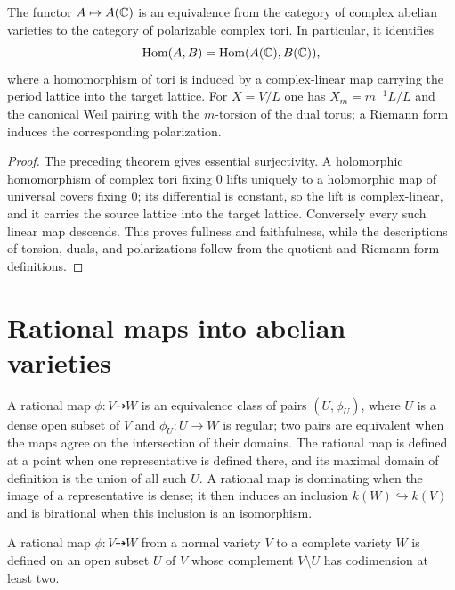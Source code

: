 \begin{theorem}
\label{thm:milne-complex-category-equivalence}

The functor $A\mapsto A(\mathbb{C})$ is an equivalence from the category of complex
abelian varieties to the category of polarizable complex tori.  In particular,
it identifies
\[
 \operatorname{Hom}(A,B)=\operatorname{Hom}(A(\mathbb{C}),B(\mathbb{C})),
\]
where a homomorphism of tori is induced by a complex-linear map carrying the
period lattice into the target lattice.  For $X=V/L$ one has
$X_m=m^{-1}L/L$ and the canonical Weil pairing with the $m$-torsion of the
dual torus; a Riemann form induces the corresponding polarization.
\end{theorem}

\begin{proof}
The preceding theorem gives essential surjectivity.  A holomorphic homomorphism
of complex tori fixing $0$ lifts uniquely to a holomorphic map of universal
covers fixing $0$; its differential is constant, so the lift is complex-linear,
and it carries the source lattice into the target lattice.  Conversely every
such linear map descends.  This proves fullness and faithfulness, while the
descriptions of torsion, duals, and polarizations follow from the quotient and
Riemann-form definitions.
\end{proof}

\section{Rational maps into abelian varieties}

\begin{definition}
\label{def:milne-rational-map}

A rational map $\phi:V\dashrightarrow W$ is an equivalence class of pairs
$(U,\phi_U)$, where $U$ is a dense open subset of $V$ and
$\phi_U:U\to W$ is regular; two pairs are equivalent when the maps agree on
the intersection of their domains.  The rational map is defined at a point
when one representative is defined there, and its maximal domain of definition
is the union of all such $U$.  A rational map is dominating when the image of
a representative is dense; it then induces an inclusion
$k(W)\hookrightarrow k(V)$ and is birational when this inclusion is an
isomorphism.
\end{definition}

\begin{theorem}
\label{thm:milne-rational-extension-complete}

A rational map $\phi:V\dashrightarrow W$ from a normal variety $V$ to a
complete variety $W$ is defined on an open subset $U$ of $V$ whose complement
$V\setminus U$ has codimension at least two.
\end{theorem}

